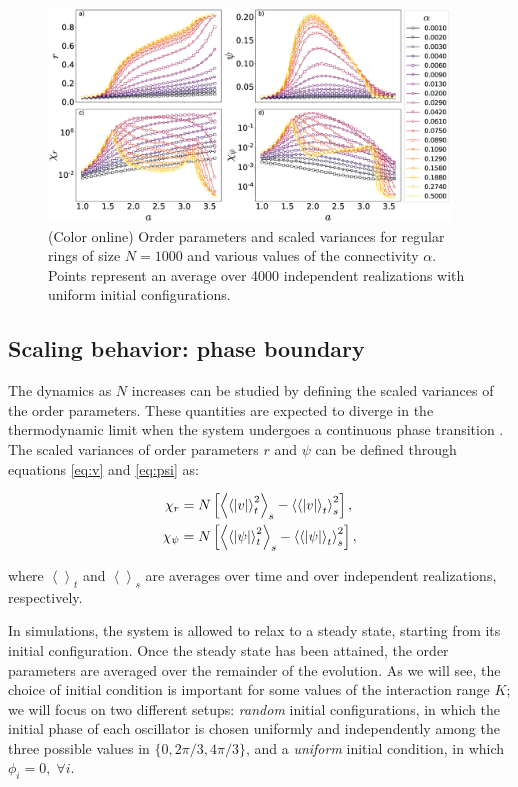 \begin{figure}[t]
\begin{center}
    \includegraphics[width=0.95\textwidth]{fig/chap2/chi_curves_uniformic.eps}
    \caption{\label{fig:chicurves}
    (Color online) Order parameters and scaled variances for regular rings of
    size $N=1000$ and various values of the connectivity $\alpha$.  Points
    represent an average over 4000 independent realizations with uniform initial
    configurations.
    }
\end{center}
\end{figure}

\subsection{Scaling behavior: phase boundary}

The dynamics as $N$ increases can be studied by defining the scaled variances of the order parameters. These quantities are expected to
diverge in the thermodynamic limit when the system undergoes a continuous phase transition \cite{plischke1994equilibrium}.  The scaled
variances of order parameters $r$ and $\psi$ can be defined through equations \ref{eq:v} and \ref{eq:psi} as:

\begin{align}
    \chi_r &= N\left[ \left< \left< |v| \right>_t^2 \right>_s - \left< \left< |v| \right>_t \right>_s^2 \right] \notag , \\
    \chi_\psi &= N\left[ \left< \left< |\psi| \right>_t^2 \right>_s - \left< \left< |\psi| \right>_t \right>_s^2 \right],
\end{align}

\noindent where $\left<\right>_t$ and $\left<\right>_s$ are averages over time and over independent realizations, respectively.

In simulations, the system is allowed to relax to a steady state, starting from its initial configuration.  Once the steady state has
been attained, the order parameters are averaged over the remainder of the evolution. As we will see, the choice of initial condition
is important for some values of the interaction range $K$; we will focus on two different setups: \textit{random} initial
configurations, in which the initial phase of each oscillator is chosen uniformly and independently among the three possible values in
$\{ 0, 2\pi/3, 4\pi/3 \}$, and a \textit{uniform} initial condition, in which $\phi_i = 0, \; \forall i$.

